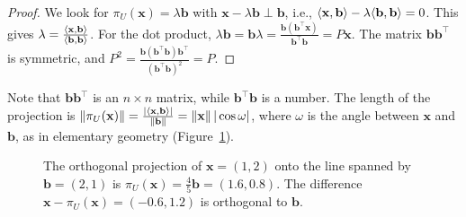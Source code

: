 \begin{proof}
    We look for $\pi_U(\mathbf{x}) = \lambda \mathbf{b}$ with $\mathbf{x} - \lambda \mathbf{b} \perp \mathbf{b}$, i.e., $\langle \mathbf{x}, \mathbf{b} \rangle - \lambda \langle \mathbf{b}, \mathbf{b} \rangle = 0$. This gives $\lambda = \frac{\langle \mathbf{x}, \mathbf{b} \rangle}{\langle \mathbf{b}, \mathbf{b} \rangle}$. For the dot product, $\lambda \mathbf{b} = \mathbf{b} \lambda = \frac{\mathbf{b} (\mathbf{b}^\top \mathbf{x})}{\mathbf{b}^\top \mathbf{b}} = P\mathbf{x}$. The matrix $\mathbf{b} \mathbf{b}^\top$ is symmetric, and $P^2 = \frac{\mathbf{b} (\mathbf{b}^\top \mathbf{b}) \mathbf{b}^\top}{(\mathbf{b}^\top \mathbf{b})^2} = P$.
\end{proof}

Note that $\mathbf{b}\mathbf{b}^\top$ is an $n \times n$ matrix, while $\mathbf{b}^\top \mathbf{b}$ is a number. The length of the projection is $\lVert \pi_U(\mathbf{x}) \rVert = \frac{|\langle \mathbf{x}, \mathbf{b} \rangle|}{\lVert \mathbf{b} \rVert} = \lVert \mathbf{x} \rVert \, |\cos\omega|$, where $\omega$ is the angle between $\mathbf{x}$ and $\mathbf{b}$, as in elementary geometry (Figure~\ref{L2-fig:projection-line}).

\begin{figure}[ht]
    \centering
    \caption[Projection onto a line]{The orthogonal projection of $\mathbf{x} = (1, 2)$ onto the line spanned by $\mathbf{b} = (2, 1)$ is $\pi_U(\mathbf{x}) = \frac{4}{5} \mathbf{b} = (1.6, 0.8)$. The difference $\mathbf{x} - \pi_U(\mathbf{x}) = (-0.6, 1.2)$ is orthogonal to $\mathbf{b}$.}
    \label{L2-fig:projection-line}
\end{figure}

